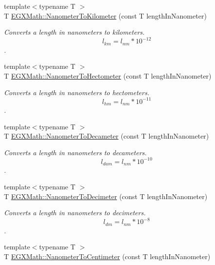 \begin{DoxyCompactItemize}
{\footnotesize template$<$typename T $>$ }\\T \mbox{\hyperlink{group___e_g_x_math-_conversions-_length_conversions-_nanometer-_s_i_gaadb5b2460069bb749412818e7aa6ee3b}{E\+G\+X\+Math\+::\+Nanometer\+To\+Kilometer}} (const T length\+In\+Nanometer)
\begin{DoxyCompactList}\small\item\em Converts a length in nanometers to kilometers. \[ l_{km}=l_{nm} * 10^{-12} \]. \end{DoxyCompactList}\item 
{\footnotesize template$<$typename T $>$ }\\T \mbox{\hyperlink{group___e_g_x_math-_conversions-_length_conversions-_nanometer-_s_i_ga106931c80902a638a38099d2fe2ba99e}{E\+G\+X\+Math\+::\+Nanometer\+To\+Hectometer}} (const T length\+In\+Nanometer)
\begin{DoxyCompactList}\small\item\em Converts a length in nanometers to hectometers. \[ l_{hm}=l_{nm} * 10^{-11} \]. \end{DoxyCompactList}\item 
{\footnotesize template$<$typename T $>$ }\\T \mbox{\hyperlink{group___e_g_x_math-_conversions-_length_conversions-_nanometer-_s_i_gabd4fa6935aab15cac606410d0da3b22d}{E\+G\+X\+Math\+::\+Nanometer\+To\+Decameter}} (const T length\+In\+Nanometer)
\begin{DoxyCompactList}\small\item\em Converts a length in nanometers to decameters. \[ l_{dam}=l_{nm} * 10^{-10} \]. \end{DoxyCompactList}\item 
{\footnotesize template$<$typename T $>$ }\\T \mbox{\hyperlink{group___e_g_x_math-_conversions-_length_conversions-_nanometer-_s_i_ga3be41b7dc346f2f5745d761c9f6c743d}{E\+G\+X\+Math\+::\+Nanometer\+To\+Decimeter}} (const T length\+In\+Nanometer)
\begin{DoxyCompactList}\small\item\em Converts a length in nanometers to decimeters. \[ l_{dm}=l_{nm} * 10^{-8} \]. \end{DoxyCompactList}\item 
{\footnotesize template$<$typename T $>$ }\\T \mbox{\hyperlink{group___e_g_x_math-_conversions-_length_conversions-_nanometer-_s_i_ga8c37dcaf6ef783c2cf44af0f65633841}{E\+G\+X\+Math\+::\+Nanometer\+To\+Centimeter}} (const T length\+In\+Nanometer)

\end{DoxyCompactItemize}

